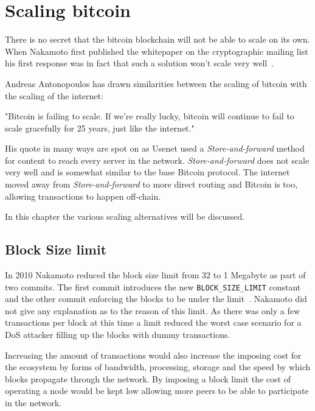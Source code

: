 \chapter{Scaling bitcoin}

There is no secret that the bitcoin blockchain will not be able to scale on its own. When Nakamoto first published the whitepaper on the cryptographic mailing list his first response was in fact that such a solution won't scale very well~\cite{donald:scale}. 

Andreas Antonopoulos has drawn similarities between the scaling of bitcoin with the scaling of the internet:

\begin{displayquote}
	"Bitcoin is failing to scale. If we’re really lucky, bitcoin will continue to fail to scale gracefully for 25 years, just like the internet."~\cite{antonopoulos:the:internet:of:money}
\end{displayquote}

His quote in many ways are spot on as Usenet used a \textit{Store-and-forward} method for content to reach every server in the network. \textit{Store-and-forward} does not scale very well and is somewhat similar to the base Bitcoin protocol. The internet moved away from \textit{Store-and-forward} to more direct routing and Bitcoin is too, allowing transactions to happen off-chain.

In this chapter the various scaling alternatives will be discussed.

\section{Block Size limit}

In 2010 Nakamoto reduced the block size limit from 32 to 1 Megabyte as part of two commits. The first commit introduces the new \texttt{BLOCK\_SIZE\_LIMIT} constant~\cite{nakamoto:commit:1} and the other commit enforcing the blocks to be under the limit~\cite{nakamoto:commit:2}. Nakamoto did not give any explanation as to the reason of this limit. As there was only a few transactions per block at this time a limit reduced the worst case scenario for a DoS attacker filling up the blocks with dummy transactions. 

Increasing the amount of transactions would also increase the imposing cost for the ecosystem by forms of bandwidth, processing, storage and the speed by which blocks propagate through the network. By imposing a block limit the cost of operating a node would be kept low allowing more peers to be able to participate in the network. 

